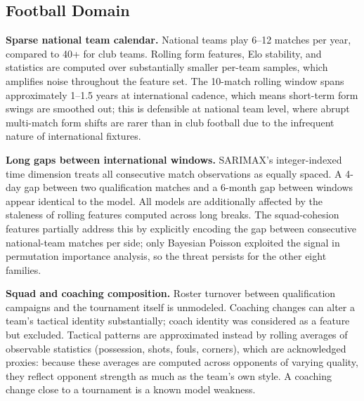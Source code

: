 \documentclass[conference]{IEEEtran}
\begin{document}
\subsection{Football Domain}

\textbf{Sparse national team calendar.}
National teams play 6--12 matches per year, compared to 40+ for club teams. Rolling form
features, Elo stability, and statistics are computed over substantially smaller per-team
samples, which amplifies noise throughout the feature set.
The 10-match rolling window spans approximately 1--1.5 years at international cadence,
which means short-term form swings are smoothed out; this is defensible at national team
level, where abrupt multi-match form shifts are rarer than in club football due to the
infrequent nature of international fixtures.

\textbf{Long gaps between international windows.}
SARIMAX's integer-indexed time dimension treats all consecutive match observations as
equally spaced. A 4-day gap between two qualification matches and a 6-month gap between
windows appear identical to the model. All models are additionally affected by the
staleness of rolling features computed across long breaks. The squad-cohesion features
partially address this by explicitly encoding the gap between consecutive
national-team matches per side; only Bayesian Poisson exploited the signal
in permutation importance analysis, so the threat persists for the other
eight families.

\textbf{Squad and coaching composition.}
Roster turnover between qualification campaigns and the tournament itself is unmodeled.
Coaching changes can alter a team's tactical identity substantially; coach identity
was considered as a feature but excluded.  Tactical patterns are approximated instead
by rolling averages of observable statistics (possession, shots, fouls, corners), which
are acknowledged proxies: because these averages are computed across opponents of varying
quality, they reflect opponent strength as much as the team's own style.
A coaching change close to a tournament is a known model weakness.
\end{document}
